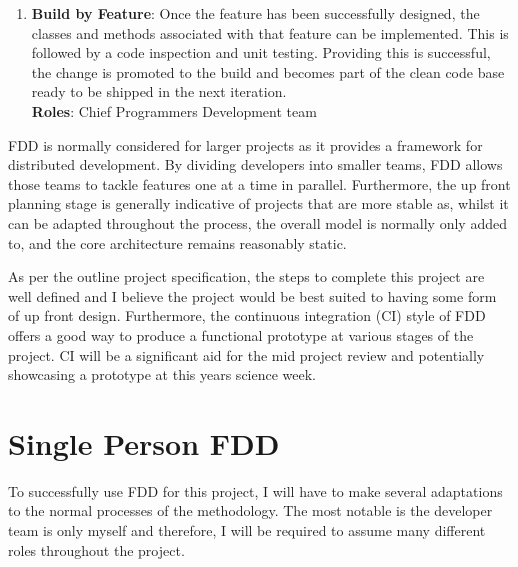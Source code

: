 \documentclass{article}
\begin{document}
\begin{enumerate}
	
	\item \textbf{Build by Feature}: Once the feature has been successfully designed, the classes and methods associated with that feature can be implemented. This is followed by a code inspection and unit testing. Providing this is successful, the change is promoted to the build and becomes part of the clean code base ready to be shipped in the next iteration.
	\\
	\textbf{Roles}: Chief Programmers \textbullet{} Development team

\end{enumerate}

FDD is normally considered for larger projects as it provides a framework for distributed development. By dividing developers into smaller teams, FDD allows those teams to tackle features one at a time in parallel. Furthermore, the up front planning stage is generally indicative of projects that are more stable as, whilst it can be adapted throughout the process, the overall model is normally only added to, and the core architecture remains reasonably static.

As per the outline project specification, the steps to complete this project are well defined and I believe the project would be best suited to having some form of up front design. Furthermore, the continuous integration (CI) style of FDD offers a good way to produce a functional prototype at various stages of the project. CI will be a significant aid for the mid project review and potentially showcasing a prototype at this years science week.

\section{Single Person FDD}
To successfully use FDD for this project, I will have to make several adaptations to the normal processes of the methodology. The most notable is the developer team is only myself and therefore, I will be required to assume many different roles throughout the project.
\end{document}
